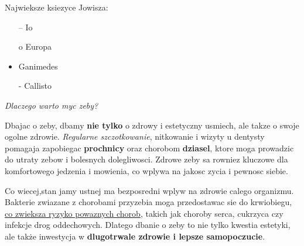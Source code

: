 \vspace{0,5cm}
\noindent Najwieksze ksiezyce Jowisza:
\begin{itemize}
    \item[--] Io
    \item[o] Europa
    \item Ganimedes
    \item[-] Callisto
\end{itemize}
\newpage
\begin{center}
    \begin{Large}
    \textit{Dlaczego warto myc zeby?}  
    \vspace{1cm}
    \end{Large}
    \par
    Dbajac o zeby, dbamy \textbf{nie tylko} o zdrowy i estetyczny usmiech, ale takze o swoje ogolne zdrowie. \textit{Regularne szczotkowanie}, nitkowanie i wizyty u dentysty pomagaja zapobiegac \textbf{prochnicy} oraz chorobom \textbf{dziasel}, ktore moga prowadzic do utraty zebow i bolesnych dolegliwosci. Zdrowe zeby sa rowniez kluczowe dla komfortowego jedzenia i mowienia, co wplywa na jakosc zycia i pewnosc siebie.
    \par
    
    Co wiecej,stan jamy ustnej ma bezposredni wplyw na zdrowie calego organizmu. Bakterie zwiazane z chorobami przyzebia moga przedostawac sie do krwiobiegu, \underline{co zwieksza ryzyko powaznych chorob}, takich jak choroby serca, cukrzyca czy infekcje drog oddechowych. Dlatego dbanie o zeby to nie tylko kwestia estetyki, ale także inwestycja w \textbf{dlugotrwale zdrowie i lepsze samopoczucie}.

\textit{}
\textbf{}
\underline{}
\end{center}






